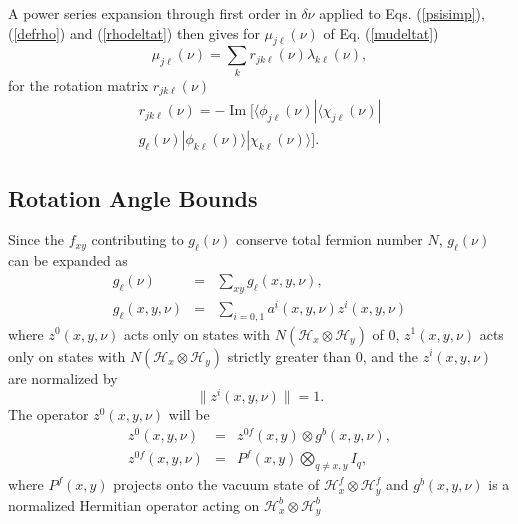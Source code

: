 \documentclass[12pt,amsmath,amssymb,onecolumn]{revtex4-2}
\begin{document}
A power series expansion through first order in 
$\delta \nu$ applied to Eqs. (\ref{psisimp}), (\ref{defrho}) and (\ref{rhodeltat})
then gives for $\mu_{j\ell}(\nu)$ of Eq. (\ref{mudeltat})
\begin{equation}
\label{ufromperturb}
\mu_{j\ell}(\nu) = \sum_k r_{jk\ell}(\nu) \lambda_{k\ell}(\nu), 
\end{equation}
for the rotation matrix $r_{jk\ell}(\nu)$
\begin{multline}
\label{rijp}
r_{jk\ell}(\nu) = 
 -\operatorname{Im}[  \langle \phi_{j\ell}(\nu)| \langle \chi_{j\ell}(\nu)| \\
g_{\ell}(\nu)|\phi_{k\ell}(\nu) \rangle |\chi_{k\ell}(\nu) \rangle ].
\end{multline}



\subsection{\label{subsec:anglebounds} Rotation Angle Bounds}

Since the $f_{xy}$ contributing to $g_\ell(\nu)$
conserve total fermion number $N$,
$g_\ell(\nu)$ can be expanded as
\begin{subequations}
\begin{eqnarray}
\label{expandg}
g_{\ell}(\nu) &=& \sum_{xy} g_{\ell}( x, y, \nu),\\
\label{expandg1}
g_{\ell}(x,y,\nu) &=& \sum_{i = 0,1} a^i(x, y, \nu) z^i(x, y, \nu)
\end{eqnarray}
\end{subequations}
where $z^0( x, y, \nu)$ acts only on states
with $N( \mathcal{H}_x \otimes \mathcal{H}_y)$ of 0,
$z^1( x, y, \nu)$ acts only on states
with $N( \mathcal{H}_x \otimes \mathcal{H}_y)$ strictly greater than 0,
and the $z^i(x,y,\nu)$ are normalized by 
\begin{equation}
\label{normzi}
\parallel z^i(x, y, \nu) \parallel   =  1.
\end{equation}
The operator
$z^0(x, y, \nu)$ will be
\begin{subequations}
\begin{eqnarray}
\label{zprojection}
z^0(x,y,\nu) &=& z^{0f}(x,y) \otimes g^b(x,y,\nu), \\
z^{0f}(x,y,\nu) &=& P^f(x,y) \bigotimes_{q \ne x,y} I_q,
\end{eqnarray}
\end{subequations}
where $P^f(x,y)$ projects onto the vacuum state
of $\mathcal{H}^f_x \otimes \mathcal{H}^f_y$
and $g^b(x,y,\nu)$ is a normalized Hermitian
operator acting on $\mathcal{H}^b_x \otimes \mathcal{H}^b_y$
\end{document}
